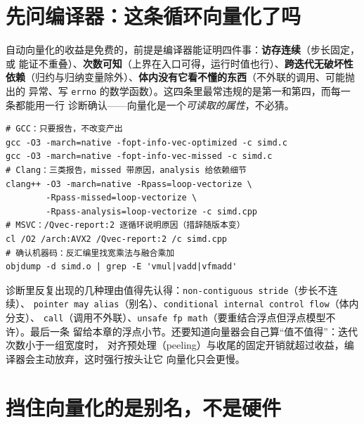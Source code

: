 \documentclass[12pt,a4paper,fontset=fandol]{ctexbook}
\newcommand{\Tp}[1]{\texttt{#1}}
\begin{document}
\section{先问编译器：这条循环向量化了吗}

自动向量化的收益是免费的，前提是编译器能证明四件事：\textbf{访存连续}（步长固定，或
能证不重叠）、\textbf{次数可知}（上界在入口可得，运行时值也行）、\textbf{跨迭代无破坏性
依赖}（归约与归纳变量除外）、\textbf{体内没有它看不懂的东西}（不外联的调用、可能抛出的
异常、写 \Tp{errno} 的数学函数）。这四条里最常违规的是第一和第四，而每一条都能用一行
诊断确认——向量化是一个\emph{可读取的属性}，不必猜。
\begin{lstlisting}[style=shellstyle,caption={三家编译器：让向量器自己交代}]
# GCC：只要报告，不改变产出
gcc -O3 -march=native -fopt-info-vec-optimized -c simd.c
gcc -O3 -march=native -fopt-info-vec-missed -c simd.c
# Clang：三类报告，missed 带原因，analysis 给依赖细节
clang++ -O3 -march=native -Rpass=loop-vectorize \
        -Rpass-missed=loop-vectorize \
        -Rpass-analysis=loop-vectorize -c simd.cpp
# MSVC：/Qvec-report:2 逐循环说明原因（措辞随版本变）
cl /O2 /arch:AVX2 /Qvec-report:2 /c simd.cpp
# 确认机器码：反汇编里找宽乘法与融合乘加
objdump -d simd.o | grep -E 'vmul|vadd|vfmadd'
\end{lstlisting}
诊断里反复出现的几种理由值得先认得：\Tp{non-contiguous stride}（步长不连续）、
\Tp{pointer may alias}（别名）、\Tp{conditional internal control flow}（体内分支）、
\Tp{call}（调用不外联）、\Tp{unsafe fp math}（要重结合浮点但浮点模型不许）。最后一条
留给本章的浮点小节。还要知道向量器会自己算``值不值得''：迭代次数小于一组宽度时，
对齐预处理（peeling）与收尾的固定开销就超过收益，编译器会主动放弃，这时强行按头让它
向量化只会更慢。

\section{挡住向量化的是别名，不是硬件}
\end{document}
